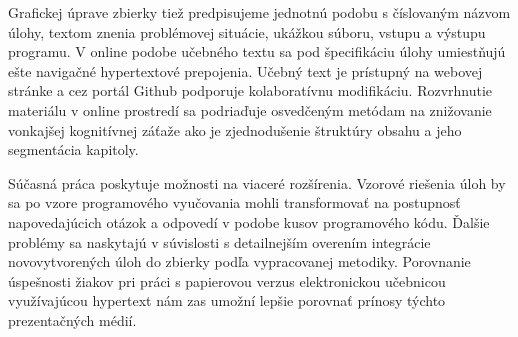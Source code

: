 Grafickej úprave zbierky tiež predpisujeme jednotnú podobu s číslovaným názvom úlohy, textom znenia problémovej situácie, ukážkou súboru, vstupu a výstupu programu. V online podobe učebného textu sa pod špecifikáciu úlohy umiestňujú ešte navigačné hypertextové prepojenia. Učebný text je prístupný na webovej stránke a cez portál Github podporuje kolaboratívnu modifikáciu. Rozvrhnutie materiálu v online prostredí sa podriaďuje osvedčeným metódam na znižovanie vonkajšej kognitívnej záťaže ako je zjednodušenie štruktúry obsahu a jeho segmentácia kapitoly.

Súčasná práca poskytuje možnosti na viaceré rozšírenia. Vzorové riešenia úloh by sa po vzore programového vyučovania mohli transformovať na postupnosť napovedajúcich otázok a odpovedí v podobe kusov programového kódu. Ďalšie problémy sa naskytajú v súvislosti s detailnejším overením integrácie novovytvorených úloh do zbierky podľa vypracovanej metodiky. Porovnanie úspešnosti žiakov pri práci s papierovou verzus elektronickou učebnicou využívajúcou hypertext nám zas umožní lepšie porovnať prínosy týchto prezentačných médií.
